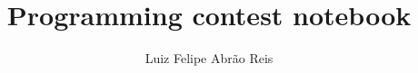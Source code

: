 \documentclass[10pt, a4paper, twoside, notitlepage]{article}
\title{Programming contest notebook}
\author{Luiz Felipe Abrão Reis}
\date{ }
\begin{document}
\begin{titlepage}
\maketitle
\tableofcontents
\end{titlepage}


%
%
%
\end{document}
